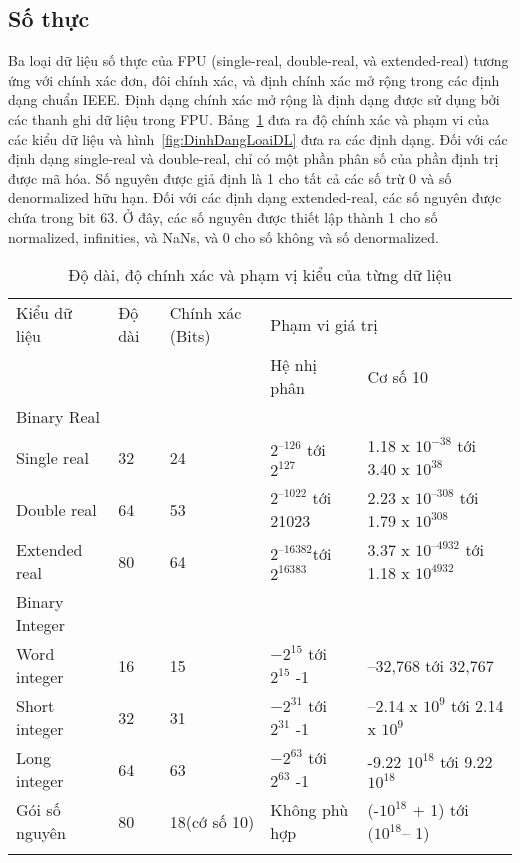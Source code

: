 		\subsection*{Số thực}
		Ba loại dữ liệu số thực của FPU (single-real, double-real, và extended-real) tương ứng với chính xác đơn, đôi chính xác, và định chính xác mở rộng trong các định dạng chuẩn IEEE. Định dạng chính xác mở rộng là định dạng được sử dụng bởi các thanh ghi dữ liệu trong FPU. Bảng~\ref{tb:DLFPU} đưa ra độ chính xác và phạm vi của các kiểu dữ liệu và hình~\ref{fig:DinhDangLoaiDL} đưa ra các định dạng. Đối với các định dạng single-real và double-real, chỉ có một phần phân số của phần định trị được mã hóa. Số nguyên được giả định là 1 cho tất cả các số trừ 0 và số denormalized hữu hạn. Đối với các định dạng extended-real, các số nguyên được chứa trong bit 63. Ở đây, các số nguyên được thiết lập thành 1 cho số normalized, infinities, và NaNs, và 0 cho số không và số denormalized. 		
		\begin{longtable}{|l|l|p{2cm}|l|l|}
		 \hline
		 	Kiểu dữ liệu & Độ dài & Chính xác (Bits) & \multicolumn{2}{l|}{Phạm vi giá trị}\\
		 	\cline{4-5}
		 	& & &  Hệ nhị phân & Cơ số 10 \\		
		\hline	
			Binary Real & & & & \\
			Single real &32 &24 & $2^{–126}$ tới $2^{127}$ & 1.18 x $10^{-38}$ tới 3.40 x $10^{38}$\\
			Double real &64 & 53 & $2^{–1022}$ tới 21023 & 2.23 x $10^{–308}  $ tới 1.79 x $10^{308} $\\
			Extended real	&	80 &64&$2^{–16382}  $tới$ 2^{16383} $  & 3.37 x $ 10^{–4932} $ tới 1.18 x $10^{4932}  $\\
		 \hline
		 Binary Integer & & & &\\
			Word integer &16 &15 & $-2 ^{15} $ tới  $ 2^{15} $ -1  &  –32,768   tới 32,767 \\
			Short integer &32 &31 &$ -2^{31} $ tới  $ 2^{31} $  -1 & –2.14 x $10 ^{9 } $ tới 2.14 x $10 ^{9} $\\
			Long integer &64 &63  &$ -2^{63} $ tới  $ 2^{63} $ -1  & -9.22 $ 10^{18} $ tới 9.22  $10 ^{18} $\\
		 \hline		
		  Gói số nguyên & 80 & 18(cớ số 10) &Không phù hợp & (-$10^{18}$ + 1) tới $(10^{18}$– 1)  \\
		 \hline			
		 		\caption{Độ dài, độ chính xác và phạm vị kiểu của từng dữ liệu}
				 \label{tb:DLFPU}
		\end{longtable}
		
